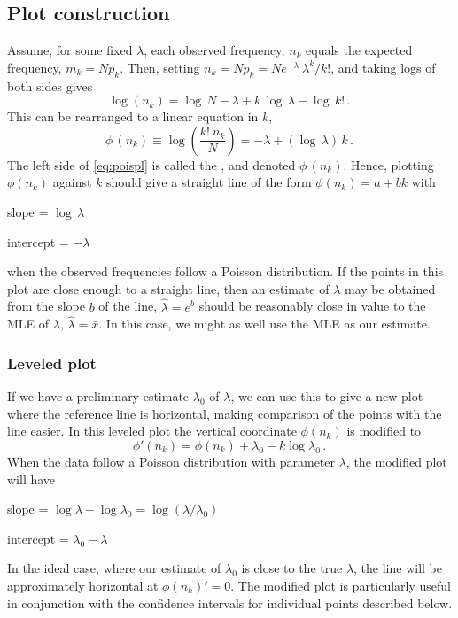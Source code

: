 \documentclass[11pt]{book}
\begin{document}
\subsection{Plot construction}
Assume, for some fixed \(\lambda\), each observed frequency, \(n_k\)
equals the expected frequency, \(m_k = N p_k\).  Then, setting
\(n_k = N p_k  = N { e^{ - \lambda } \:  \lambda^k } /  { k ! }\),
and taking logs of both sides gives
\begin{equation*}
  \log ( n_k ) = \log \,  N - \lambda  +  k \,  \log \,  \lambda  -
  \log \,  k !
  \period
\end{equation*}
This can be rearranged to a linear equation in $k$,
\begin{equation} \label{eq:poispl}
  \phi \,  ( n_k ) \equiv \log \left(  \frac{ k ! \:  n_k } {N} \right)
 = - \lambda  +  ( \log \,  \lambda ) \,  k
 \period
\end{equation}
The left side of \eqref{eq:poispl} is called the , and
denoted \(\phi \,  ( n_k )\).  Hence,
plotting \(\phi ( n_k )\) against \(k\) should give a straight line of the form
\(\phi ( n_k )= a + b k\) with
\begin{itemize*}
\item slope = \(\log  \,  \lambda\)
\item intercept = \(- \lambda\)
\end{itemize*}
when the observed frequencies follow a Poisson distribution.
If the points in this plot are close enough to a straight line,
then an estimate of $\lambda$ may be obtained from the slope $b$ of the line,
$\hat{\lambda} = e^b$ should be reasonably close in value
to the MLE of $\lambda$, $\hat{\lambda} = \bar{x}$.
In this case, we might as well use the MLE as our estimate.

\subsubsection{Leveled plot}
If we have a preliminary estimate $\lambda_0$ of $\lambda$,
we can use this to give a new plot where the reference line
is horizontal, making comparison of the points with the line
easier.
In this leveled plot the vertical coordinate $\phi (n_k)$ is modified to
\begin{equation}\label{eq:pois-leveled}
 \phi ' (n_k) = \phi (n_k) + \lambda_0 - k \log \lambda_0
 \period
\end{equation}
When the data follow a Poisson distribution with parameter
$\lambda$, the modified plot will have
\begin{itemize*}
\item slope = \(\log  \lambda - \log  \lambda_0 = \log ( \lambda / \lambda_0 ) \)
\item intercept = \(\lambda_0 - \lambda\)
\end{itemize*}
In the ideal case, where our estimate of $\lambda_0$ is close to the true
$\lambda$, the line will be approximately
horizontal at $\phi(n_k) ' = 0$.
The modified plot is particularly useful in conjunction with the
confidence intervals for individual points described below.
\end{document}

